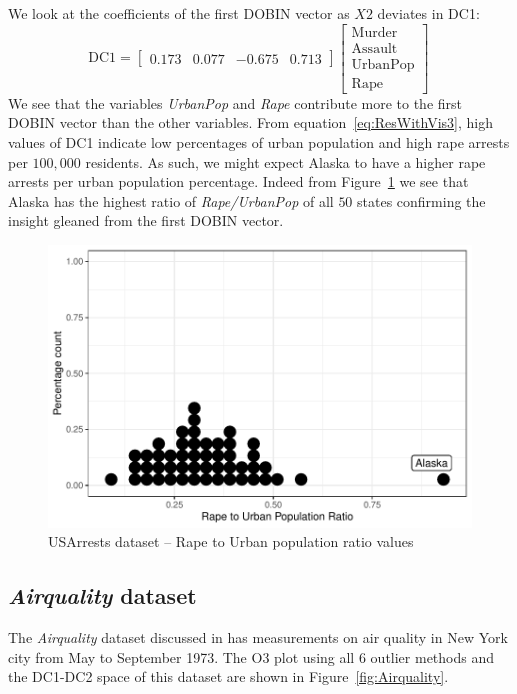 \documentclass[a4paper,11pt]{article}
\begin{document}
We look at the coefficients of the first DOBIN vector as  $X2$ deviates in DC1:
\begin{equation}\label{eq:ResWithVis3}
    \text{DC1} = \begin{bmatrix}
    0.173 & 0.077 &  -0.675 & 0.713
    \end{bmatrix}
    \begin{bmatrix}
    \text{Murder} \\
    \text{Assault} \\
    \text{UrbanPop} \\
    \text{Rape}
    \end{bmatrix} \,
\end{equation}
We see that the variables \textit{UrbanPop} and \textit{Rape} contribute more to the first DOBIN vector than the other variables. From equation~\eqref{eq:ResWithVis3},  high values of DC1 indicate  low percentages of urban population and high rape arrests per $100,000$ residents. As such, we might expect Alaska to have a higher rape arrests per urban population percentage. Indeed from Figure~\ref{fig:USArrests3} we see that Alaska has the highest ratio of  \textit{Rape/UrbanPop} of all $50$ states confirming the insight gleaned from the first DOBIN vector.

\begin{figure}[!ht]
	\centering
	\includegraphics[scale=0.48]{Ex3_3.pdf}
	\caption{USArrests dataset -- Rape to Urban population ratio values}
	\label{fig:USArrests3}
\end{figure}


\subsection{\textit{Airquality} dataset}\label{sec:ResWithVis4}
The \textit{Airquality} dataset discussed in \cite{john1983graphical} has measurements on air quality in New York city from May to September 1973.  The O3 plot using all $6$ outlier methods and the DC1-DC2 space of this dataset are shown in Figure~\ref{fig:Airquality}.
\end{document}
